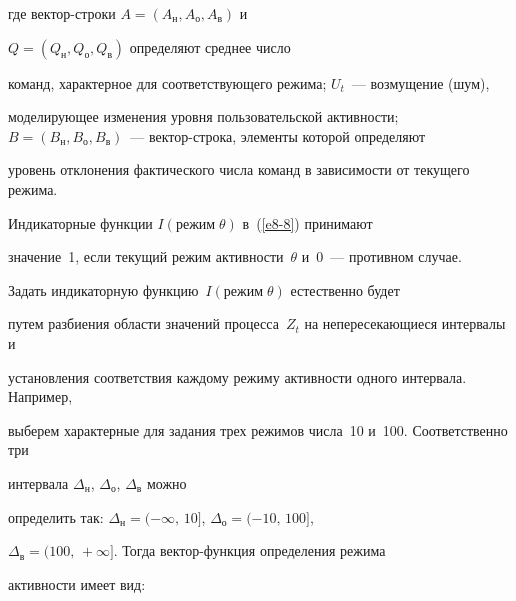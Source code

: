 где век\-тор-стро\-ки $A=(A_{\mathrm{н}}, A_{\mathrm{о}}, A_{\mathrm{в}})$ и 


$Q=(Q_{\mathrm{н}}, Q_{\mathrm{о}}, Q_{\mathrm{в}})$ определяют среднее число 


команд, характерное для со\-от\-вет\-ст\-ву\-юще\-го режима; $U_t$~---  возмущение (шум), 


моделирующее изменения уровня пользовательской активности;  $B =(B_{\mathrm{н}}, 


B_{\mathrm{о}}, B_{\mathrm{в}})$~--- век\-тор-стро\-ка, элементы которой определяют 


уровень отклонения фактического числа команд в зависимости от текущего режима. 


Индикаторные функции $ I(\mbox{режим}\; \theta )$ в~(\ref{e8-8}) принимают 


значение~1, если текущий режим активности~$\theta$ и~0~--- противном случае.


      


      Задать индикаторную функцию~$ I(\mbox{режим}\; \theta)$ естественно будет 


путем разбиения области значений процесса~$Z_t$ на непересекающиеся интервалы и 


установления соответствия каждому режиму активности одного интервала. Например, 


выберем характерные для задания трех режимов числа~10 и~100. Соответственно три 


интервала $\Delta_{\mathrm{н}}$, $\Delta_{\mathrm{о}}$, $\Delta_{\mathrm{в}}$ можно 


определить так: $\Delta_{\mathrm{н}}=(-\infty,\,10]$, $\Delta_{\mathrm{о}}=(-10,\,100]$, 


$\Delta_{\mathrm{в}}=(100,\,+\infty]$. Тогда век\-тор-функ\-ция определения режима 


активности имеет вид:


